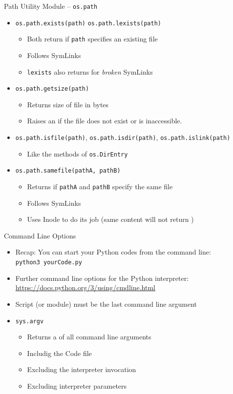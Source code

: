 \begin{frame}{Path Utility Module -- \texttt{os.path}}
%
\begin{itemize}
\item \texttt{os.path.exists(path)} \texttt{os.path.lexists(path)}
	\begin{itemize}
	\item Both return  if \texttt{path} specifies an existing file
	\item Follows SymLinks
	\item \texttt{lexists} also returns  for \emph{broken} SymLinks
	\end{itemize}
\item \texttt{os.path.getsize(path)}
	\begin{itemize}
	\item Returns size of file in bytes
	\item Raises an  if the file does not exist or is inaccessible.
	\end{itemize}
\item \texttt{os.path.isfile(path)}, \texttt{os.path.isdir(path)}, \texttt{os.path.islink(path)}
	\begin{itemize}
	\item Like the methods of \texttt{os.DirEntry}
	\end{itemize}
\item \texttt{os.path.samefile(pathA, pathB)}
	\begin{itemize}
	\item Returns  if \texttt{pathA} and \texttt{pathB} specify the same file
	\item Follows SymLinks
	\item Uses Inode to do its job (\ie same content will not return )
	\end{itemize}
\end{itemize}
%
\end{frame}


\begin{frame}{Command Line Options}
%
\begin{itemize}
\item Recap: You can start your Python codes from the command line:\\
	\texttt{python3 yourCode.py}
\item Further command line options for the Python interpreter: \url{https://docs.python.org/3/using/cmdline.html}
\item Script (or module) must be the last command line argument
\item \texttt{sys.argv}
	\begin{itemize}
	\item Returns a  of all command line arguments
	\item Includig the Code file
	\item Excluding the interpreter invocation
	\item Excluding interpreter parameters
	\end{itemize}
\end{itemize}
%
\end{frame}

